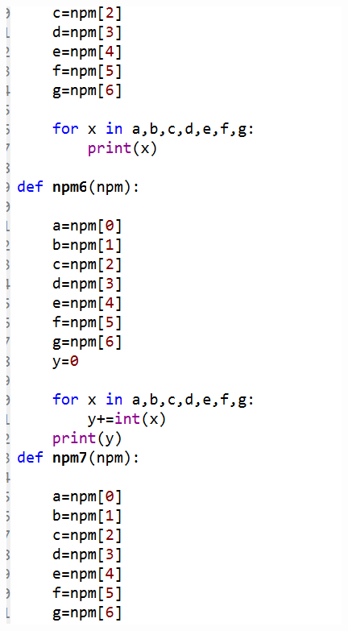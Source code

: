 \documentclass[a4paper, 12pt]{article}
\begin{document}
\begin{center}
\includegraphics[width=.8\textwidth]{figure/11bPNG.PNG}
\end{center}
\end{document}
